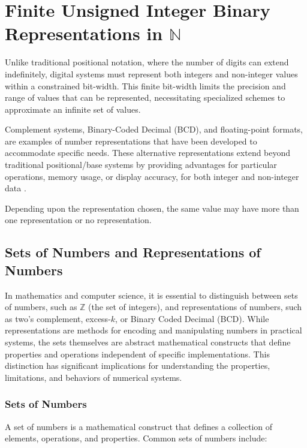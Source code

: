 \chapter{Finite Unsigned Integer Binary Representations in $\mathbb{N}$}
\localtoc
Unlike traditional positional notation, where the number of digits can extend indefinitely, digital systems must represent both integers and non-integer values within a constrained bit-width. This finite bit-width limits the precision and range of values that can be represented, necessitating specialized schemes to approximate an infinite set of values.

Complement systems, Binary-Coded Decimal (BCD), and floating-point formats, are examples of number representations that have been developed to accommodate specific needs. These alternative representations extend beyond traditional positional/base systems by providing advantages for particular operations, memory usage, or display accuracy, for both integer and non-integer data \cite{knuth1997, rosen2018, tanenbaum2013}. 

Depending upon the representation chosen, the same value may have more than one representation or no representation.

\section{Sets of Numbers and Representations of Numbers}
In mathematics and computer science, it is essential to distinguish between sets of numbers, such as \( \mathbb{Z} \) (the set of integers), and representations of numbers, such as two's complement, excess-\( k \), or Binary Coded Decimal (BCD). While representations are methods for encoding and manipulating numbers in practical systems, the sets themselves are abstract mathematical constructs that define properties and operations independent of specific implementations. This distinction has significant implications for understanding the properties, limitations, and behaviors of numerical systems.

\subsection{Sets of Numbers}
A set of numbers is a mathematical construct that defines a collection of elements, operations, and properties. Common sets of numbers include:

